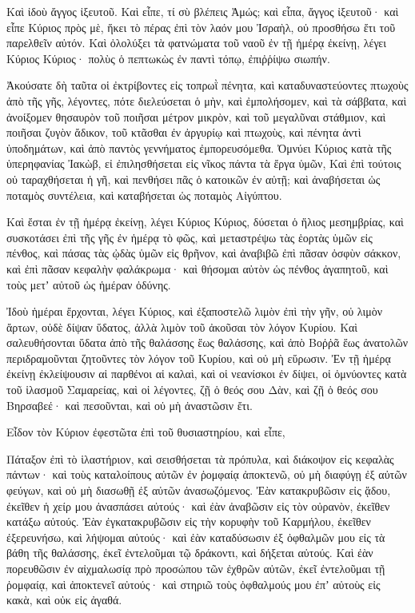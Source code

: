 \begin{spacing}{1.1}
\begin{multicols}{2}
Καὶ ἰδοὺ ἄγγος ἰξευτοῦ. Καὶ εἶπε, τί σὺ βλέπεις Ἀμώς; καὶ εἶπα, ἄγγος ἰξευτοῦ·
καὶ εἶπε Κύριος πρὸς μὲ, ἥκει τὸ πέρας ἐπὶ τὸν λαόν μου Ἰσραὴλ, οὐ προσθήσω ἔτι τοῦ παρελθεῖν αὐτόν.
Καὶ ὀλολύξει τὰ φατνώματα τοῦ ναοῦ ἐν τῇ ἡμέρᾳ ἐκείνῃ, λέγει Κύριος Κύριος· πολὺς ὁ πεπτωκὼς ἐν παντὶ τόπῳ, ἐπιῤῥίψω σιωπήν.

Ἀκούσατε δὴ ταῦτα οἱ ἐκτρίβοντες εἰς τοπρωῒ πένητα, καὶ καταδυναστεύοντες πτωχοὺς ἀπὸ τῆς γῆς,
λέγοντες, πότε διελεύσεται ὁ μὴν, καὶ ἐμπολήσομεν, καὶ τὰ σάββατα, καὶ ἀνοίξομεν θησαυρὸν τοῦ ποιῆσαι μέτρον μικρὸν, καὶ τοῦ μεγαλῦναι στάθμιον, καὶ ποιῆσαι ζυγὸν ἄδικον,
τοῦ κτᾶσθαι ἐν ἀργυρίῳ καὶ πτωχοὺς, καὶ πένητα ἀντὶ ὑποδημάτων, καὶ ἀπὸ παντὸς γεννήματος ἐμπορευσόμεθα.
Ὀμνύει Κύριος κατὰ τῆς ὑπερηφανίας Ἰακὼβ, εἰ ἐπιλησθήσεται εἰς νῖκος πάντα τὰ ἔργα ὑμῶν,
Καὶ ἐπὶ τούτοις οὐ ταραχθήσεται ἡ γῆ, καὶ πενθήσει πᾶς ὁ κατοικῶν ἐν αὐτῇ; καὶ ἀναβήσεται ὡς ποταμὸς συντέλεια, καὶ καταβήσεται ὡς ποταμὸς Αἰγύπτου.

Καὶ ἔσται ἐν τῇ ἡμέρᾳ ἐκείνῃ, λέγει Κύριος Κύριος, δύσεται ὁ ἥλιος μεσημβρίας, καὶ συσκοτάσει ἐπὶ τῆς γῆς ἐν ἡμέρᾳ τὸ φῶς,
καὶ μεταστρέψω τὰς ἑορτὰς ὑμῶν εἰς πένθος, καὶ πάσας τὰς ᾠδὰς ὑμῶν εἰς θρῆνον, καὶ ἀναβιβῶ ἐπὶ πᾶσαν ὀσφὺν σάκκον, καὶ ἐπὶ πᾶσαν κεφαλὴν φαλάκρωμα· καὶ θήσομαι αὐτὸν ὡς πένθος ἀγαπητοῦ, καὶ τοὺς μετʼ αὐτοῦ ὡς ἡμέραν ὀδύνης.

Ἰδοὺ ἡμέραι ἔρχονται, λέγει Κύριος, καὶ ἐξαποστελῶ λιμὸν ἐπὶ τὴν γῆν, οὐ λιμὸν ἄρτων, οὐδὲ δίψαν ὕδατος, ἀλλὰ λιμὸν τοῦ ἀκοῦσαι τὸν λόγον Κυρίου.
Καὶ σαλευθήσονται ὕδατα ἀπὸ τῆς θαλάσσης ἕως θαλάσσης, καὶ ἀπὸ Βοῤῥᾶ ἕως ἀνατολῶν περιδραμοῦνται ζητοῦντες τὸν λόγον τοῦ Κυρίου, καὶ οὐ μὴ εὕρωσιν.
Ἐν τῇ ἡμέρᾳ ἐκείνῃ ἐκλείψουσιν αἱ παρθένοι αἱ καλαὶ, καὶ οἱ νεανίσκοι ἐν δίψει,
οἱ ὀμνύοντες κατὰ τοῦ ἱλασμοῦ Σαμαρείας, καὶ οἱ λέγοντες, ζῇ ὁ θεός σου Δὰν, καὶ ζῇ ὁ θεός σου Βηρσαβεέ· καὶ πεσοῦνται, καὶ οὐ μὴ ἀναστῶσιν ἔτι.

Εἶδον τὸν Κύριον ἐφεστῶτα ἐπὶ τοῦ θυσιαστηρίου, καὶ εἶπε,

Πάταξον ἐπὶ τὸ ἱλαστήριον, καὶ σεισθήσεται τὰ πρόπυλα, καὶ διάκοψον εἰς κεφαλὰς πάντων· καὶ τοὺς καταλοίπους αὐτῶν ἐν ῥομφαίᾳ ἀποκτενῶ, οὐ μὴ διαφύγῃ ἐξ αὐτῶν φεύγων, καὶ οὐ μὴ διασωθῇ ἐξ αὐτῶν ἀνασωζόμενος.
Ἐὰν κατακρυβῶσιν εἰς ᾅδου, ἐκεῖθεν ἡ χείρ μου ἀνασπάσει αὐτούς· καὶ ἐὰν ἀναβῶσιν εἰς τὸν οὐρανὸν, ἐκεῖθεν κατάξω αὐτούς.
Ἐὰν ἐγκατακρυβῶσιν εἰς τὴν κορυφὴν τοῦ Καρμήλου, ἐκεῖθεν ἐξερευνήσω, καὶ λήψομαι αὐτούς· καὶ ἐὰν καταδύσωσιν ἐξ ὀφθαλμῶν μου εἰς τὰ βάθη τῆς θαλάσσης, ἐκεῖ ἐντελοῦμαι τῷ δράκοντι, καὶ δήξεται αὐτούς.
Καὶ ἐὰν πορευθῶσιν ἐν αἰχμαλωσίᾳ πρὸ προσώπου τῶν ἐχθρῶν αὐτῶν, ἐκεῖ ἐντελοῦμαι τῇ ῥομφαίᾳ, καὶ ἀποκτενεῖ αὐτούς· καὶ στηριῶ τοὺς ὀφθαλμούς μου ἐπʼ αὐτοὺς εἰς κακὰ, καὶ οὐκ εἰς ἀγαθά.


\end{multicols}
\end{spacing}
